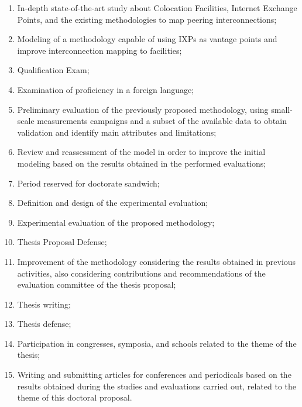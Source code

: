 \begin{enumerate}

\item In-depth state-of-the-art study about Colocation Facilities, Internet Exchange Points, and the existing methodologies to map peering interconnections; \label{it:estado-da-arte}

\item Modeling of a methodology capable of using IXPs as vantage points and improve interconnection mapping to facilities; \label{it:modelagem}

\item Qualification Exam; \label{it:qualif}

\item Examination of proficiency in a foreign language; \label{it:idioma}

\item Preliminary evaluation of the previously proposed methodology, using small-scale measurements campaigns and a subset of the available data to obtain validation and identify main attributes and limitations; \label{it:aval-anali}

\item Review and reassessment of the model in order to improve the initial modeling based on the results obtained in the performed evaluations; \label{it:rev-modelo}

\item Period reserved for doctorate sandwich; \label{it:sanduba}

\item Definition and design of the experimental evaluation; \label{it:proj-amb-exp}

\item Experimental evaluation of the proposed methodology; \label{it:aval-larga-escala}

\item Thesis Proposal Defense; \label{it:def-prop-tese}

\item Improvement of the methodology considering the results obtained in previous activities, also considering contributions and recommendations of the evaluation committee of the thesis proposal; \label{it:rev-final-modelo}

\item Thesis writing; \label{it:redacao}

\item Thesis defense; \label{it:def-tese}

\item Participation in congresses, symposia, and schools related to the theme of the thesis; \label{it:part-cong}

\item Writing and submitting articles for conferences and periodicals based on the results obtained during the studies and evaluations carried out, related to the theme of this doctoral proposal. \label{it:submissoes}
\end{enumerate}

